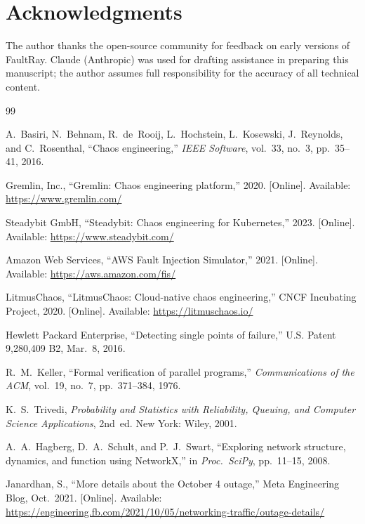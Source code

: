 \documentclass[10pt,twocolumn]{article}
\begin{document}
\section*{Acknowledgments}
The author thanks the open-source community for feedback on early versions of FaultRay.
Claude (Anthropic) was used for drafting assistance in preparing this manuscript;
the author assumes full responsibility for the accuracy of all technical content.

\begin{thebibliography}{99}

A.~Basiri, N.~Behnam, R.~de~Rooij, L.~Hochstein, L.~Kosewski,
J.~Reynolds, and C.~Rosenthal,
``Chaos engineering,''
\textit{IEEE Software}, vol.~33, no.~3, pp.~35--41, 2016.

Gremlin, Inc.,
``Gremlin: Chaos engineering platform,''
2020. [Online]. Available: \url{https://www.gremlin.com/}

Steadybit GmbH,
``Steadybit: Chaos engineering for Kubernetes,''
2023. [Online]. Available: \url{https://www.steadybit.com/}

Amazon Web Services,
``AWS Fault Injection Simulator,''
2021. [Online]. Available:
\url{https://aws.amazon.com/fis/}

LitmusChaos,
``LitmusChaos: Cloud-native chaos engineering,''
CNCF Incubating Project, 2020. [Online]. Available:
\url{https://litmuschaos.io/}

Hewlett Packard Enterprise,
``Detecting single points of failure,''
U.S. Patent 9,280,409 B2, Mar.~8, 2016.

R.~M.~Keller,
``Formal verification of parallel programs,''
\textit{Communications of the ACM}, vol.~19, no.~7,
pp.~371--384, 1976.

K.~S.~Trivedi,
\textit{Probability and Statistics with Reliability, Queuing, and
Computer Science Applications}, 2nd~ed.
New York: Wiley, 2001.

A.~A.~Hagberg, D.~A.~Schult, and P.~J.~Swart,
``Exploring network structure, dynamics, and function using NetworkX,''
in \textit{Proc.\ SciPy}, pp.~11--15, 2008.

Janardhan, S.,
``More details about the October 4 outage,''
Meta Engineering Blog, Oct.~2021. [Online]. Available:
\url{https://engineering.fb.com/2021/10/05/networking-traffic/outage-details/}


\end{thebibliography}
\end{document}
